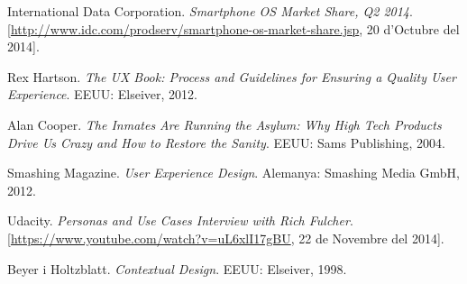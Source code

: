 \begin{thebibliography}{9}

International Data Corporation. \textit{Smartphone OS Market Share, Q2 2014}. [\url{http://www.idc.com/prodserv/smartphone-os-market-share.jsp}, 20 d'Octubre del 2014].

Rex Hartson. \textit{The UX Book: Process and Guidelines for Ensuring a Quality User Experience}. EEUU: Elseiver, 2012. %

Alan Cooper. \textit{The Inmates Are Running the Asylum: Why High Tech Products Drive Us Crazy and How to Restore the Sanity}. EEUU: Sams Publishing, 2004.

Smashing Magazine. \textit{User Experience Design}. Alemanya: Smashing Media GmbH, 2012. %

Udacity. \textit{Personas and Use Cases Interview with Rich Fulcher}. [\url{https://www.youtube.com/watch?v=uL6xlI17gBU}, 22 de Novembre del 2014]. 

Beyer i Holtzblatt. \textit{Contextual Design}. EEUU: Elseiver, 1998.


\end{thebibliography}